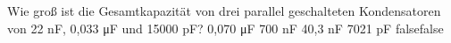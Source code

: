     {Wie groß ist die Gesamtkapazität von drei parallel geschalteten Kondensatoren von 22 nF, 0,033 μF und 15000 pF?}
    {0,070 μF}
    {700 nF}
    {40,3 nF}
    {7021 pF}
    {false}{false}